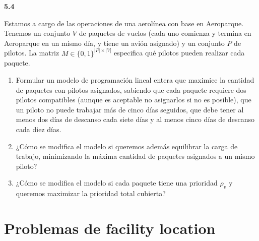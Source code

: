 \documentclass[11pt,a4paper]{article}
\newcommand{\ejercicio}[1]{\par\medskip\noindent\textbf{#1}\par\nopagebreak\smallskip}
\begin{document}
\ejercicio{5.4}
Estamos a cargo de las operaciones de una aerolínea con base en Aeroparque.
Tenemos un conjunto $V$ de paquetes de vuelos (cada uno comienza y termina en
Aeroparque en un mismo día, y tiene un avión asignado) y un conjunto $P$ de
pilotos. La matriz $M \in \{0,1\}^{|P| \times |V|}$ especifica qué pilotos pueden
realizar cada paquete.
\begin{enumerate}
  \item Formular un modelo de programación lineal entera que maximice la
  cantidad de paquetes con pilotos asignados, sabiendo que cada paquete requiere
  dos pilotos compatibles (aunque es aceptable no asignarlos si no es posible),
  que un piloto no puede trabajar más de cinco días seguidos, que debe tener al
  menos dos días de descanso cada siete días y al menos cinco días de descanso
  cada diez días.
  \item ¿Cómo se modifica el modelo si queremos además equilibrar la carga de
  trabajo, minimizando la máxima cantidad de paquetes asignados a un mismo
  piloto?
  \item ¿Cómo se modifica el modelo si cada paquete tiene una prioridad
  $\rho_v$ y queremos maximizar la prioridad total cubierta?
\end{enumerate}

\section{Problemas de facility location}
\end{document}
